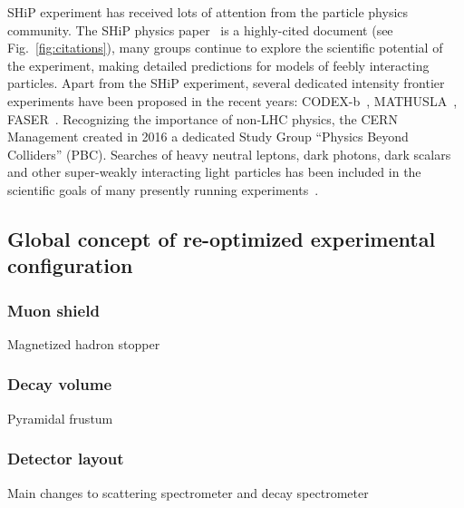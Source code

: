 SHiP experiment has received lots of attention from the particle physics community. The SHiP physics paper~\cite{Alekhin:2015byh} is a highly-cited document (see Fig.~\ref{fig:citations}),  many groups continue to explore the scientific potential of the experiment, making detailed predictions for models of feebly interacting particles.
Apart from the SHiP experiment, several dedicated intensity frontier experiments have been proposed in the recent years: CODEX-b~\cite{Gligorov:2017nwh},
MATHUSLA~\cite{Chou:2016lxi,Curtin:2017izq,Evans:2017lvd},
FASER~\cite{Feng:2017uoz,Feng:2017vli,Kling:2018wct}. Recognizing the importance of non-LHC physics, the CERN Management created in 2016 a dedicated Study Group “Physics Beyond Colliders” (PBC). 
Searches of heavy neutral leptons, dark photons, dark scalars and other super-weakly interacting light particles has been included in the scientific goals of many presently running experiments~\cite{Aaij:2014aba,Khachatryan:2015gha,Aad:2015xaa,Sirunyan:2018mtv,Izmaylov:2017lkv, Mermod:2017ceo,CortinaGil:2017mqf,Antusch:2017hhu,Drewes:2018gkc,Liventsev:2013zz,Kwon:2017anc,TheBelle:2015mwa,Lees:2017lec,Banerjee:2016tad,Aaboud:2018jbr,Aaij:2017rft}.



\subsection{Global concept of re-optimized experimental configuration}

\subsubsection{Muon shield}
Magnetized hadron stopper

\subsubsection{{Decay volume}}
Pyramidal frustum

\subsubsection{Detector layout}
Main changes to scattering spectrometer and decay spectrometer